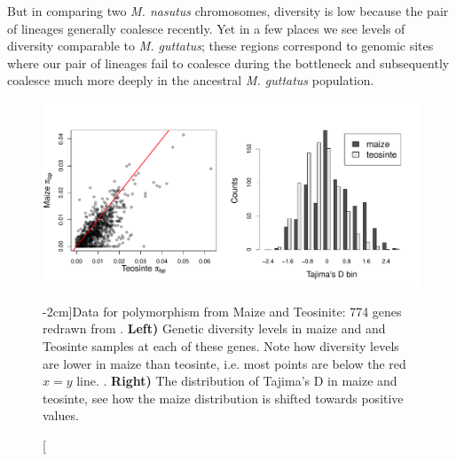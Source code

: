  But in comparing two {\it
  M. nasutus} chromosomes, diversity is low because the pair of lineages generally coalesce
recently. Yet in a few places we see levels of diversity comparable to
{\it M. guttatus}; these regions correspond to genomic sites where our pair of lineages
fail to coalesce during the bottleneck and subsequently coalesce
much more deeply in the ancestral {\it M. guttatus} population.
\begin{figure}
\begin{center}
  \includegraphics[width = \textwidth]{Journal_figs/genetic_drift/Maize_bottleneck/Wright_Tajima_D.pdf}
\end{center}
\caption[][-2cm]{Data for polymorphism from Maize and Teosinite: 774
  genes redrawn from \citet{Wright:05}. {\bf Left)} Genetic  diversity levels in maize and and Teosinte samples at each of these genes.
Note how diversity levels are lower in maize than teosinte, i.e. most
points are below the red $x=y$ line.  
. {\bf Right)} The distribution of Tajima's D in maize and teosinte, see how the maize distribution is shifted towards positive values. } \label{fig:maize_Tajimas_D}  %
\end{figure}
